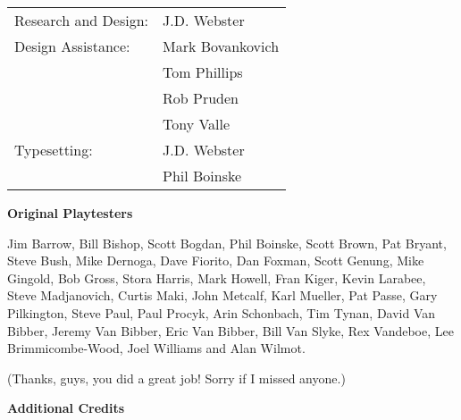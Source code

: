 \begin{tabularx}{\linewidth}{@{}LL@{}}
Research and Design: &J.D. Webster\\
Design Assistance:   &Mark Bovankovich\\
                     &Tom Phillips\\
                     &Rob Pruden\\
                     &Tony Valle\\
Typesetting:         &J.D. Webster\\
                     &Phil Boinske\\
\end{tabularx}

\begin{center}
\textbf{\Large Original Playtesters}
\end{center}

{
\sloppy
Jim Barrow, Bill Bishop, Scott Bogdan, Phil Boinske, Scott Brown, Pat Bryant, Steve Bush, Mike Dernoga, Dave Fiorito, Dan Foxman, Scott Genung, Mike Gingold, Bob Gross, Stora Harris, Mark Howell, Fran Kiger, Kevin Larabee, Steve Madjanovich, Curtis Maki, John Metcalf, Karl Mueller, Pat Passe, Gary Pilkington, Steve Paul, Paul Procyk, Arin Schonbach, Tim Tynan, David Van Bibber, Jeremy Van Bibber, Eric Van Bibber, Bill Van Slyke, Rex Vandeboe, Lee Brimmicombe-Wood, Joel Williams and Alan Wilmot.
\par
}

(Thanks, guys, you did a great job! Sorry if I missed anyone.)

\newpage

\begin{center}
\textbf{\Large Additional Credits}
\end{center}

